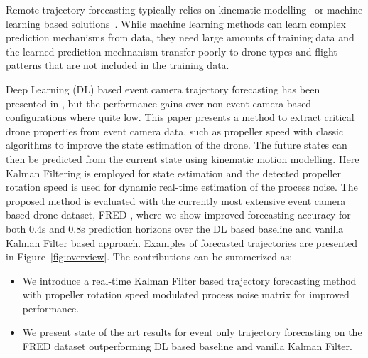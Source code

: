 \documentclass[letterpaper, 10 pt, conference]{ieeeconf}  %
\begin{document}
Remote trajectory forecasting typically relies on kinematic modelling~\cite{peng2018unified} or machine learning based solutions~\cite{wang2024enhanced,becker2021generating,magrini_fred_2025}. While machine learning methods can learn complex prediction mechanisms from data, they need large amounts of training data and the learned prediction mechnanism transfer poorly to drone types and flight patterns that are not included in the training data. 

Deep Learning (DL) based event camera trajectory forecasting has been presented in \cite{magrini_fred_2025}, but the performance gains over non event-camera based configurations where quite low. This paper presents a method to extract critical drone properties from event camera data, such as propeller speed with classic algorithms to improve the state estimation of the drone. The future states can then be predicted from the current state using kinematic motion modelling. Here Kalman Filtering is employed for state estimation and the detected propeller rotation speed is used for dynamic real-time estimation of the process noise. The proposed method is evaluated with the currently most extensive event camera based drone dataset, FRED \cite{magrini_fred_2025}, where we show improved forecasting accuracy for both 0.4s and 0.8s prediction horizons over the DL based baseline and vanilla Kalman Filter based approach. Examples of forecasted trajectories are presented in Figure~\ref{fig:overview}. The contributions can be summerized as: 
\begin{itemize}
    \item We introduce a real-time Kalman Filter based trajectory forecasting method with propeller rotation speed modulated process noise matrix for improved performance. 
    \item We present state of the art results for event only trajectory forecasting on the FRED dataset \cite{magrini_fred_2025} outperforming DL based baseline and vanilla Kalman Filter.
\end{itemize}
\end{document}
